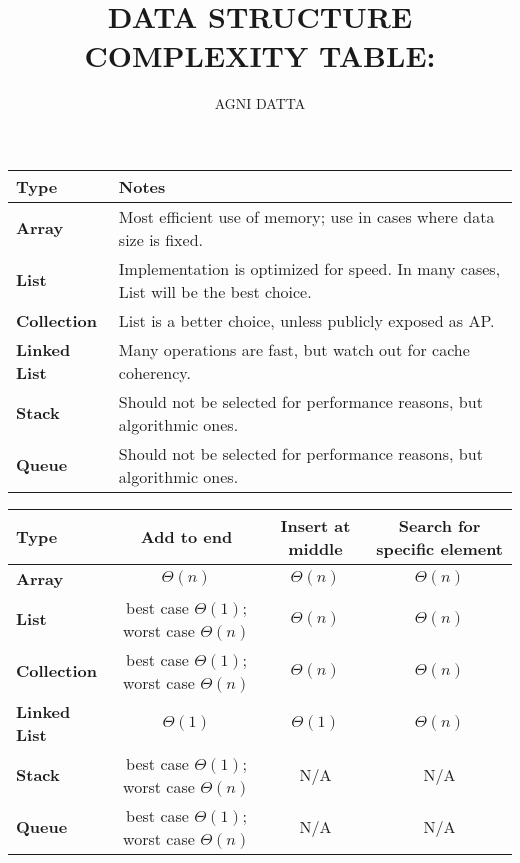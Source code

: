 \documentclass{article}
\providecommand{\tabularnewline}{\\}
\begin{document}
\title{\textbf{DATA STRUCTURE COMPLEXITY TABLE:}}
\author{AGNI DATTA}

\maketitle
\medskip{}

\begin{center}
{\small{}}%
\begin{tabular}{|l|l|}
\hline 
\textbf{\small{}Type} & \textbf{\small{}Notes}\tabularnewline
\hline 
\hline 
\textbf{\small{}Array} & {\small{}Most efficient use of memory; use in cases where data size
is fixed.}\tabularnewline
\hline 
\textbf{\small{}List} & {\small{}Implementation is optimized for speed. In many cases, List
will be the best choice.}\tabularnewline
\hline 
\textbf{\small{}Collection} & {\small{}List is a better choice, unless publicly exposed as AP.}\tabularnewline
\hline 
\textbf{\small{}Linked List} & {\small{}Many operations are fast, but watch out for cache coherency.}\tabularnewline
\hline 
\textbf{\small{}Stack} & {\small{}Should not be selected for performance reasons, but algorithmic
ones.}\tabularnewline
\hline 
\textbf{\small{}Queue} & {\small{}Should not be selected for performance reasons, but algorithmic
ones.}\tabularnewline
\hline 
\end{tabular}{\small\par}
\par\end{center}

\begin{center}
{\small{}\medskip{}
}{\small\par}
\par\end{center}

\begin{center}
{\small{}}%
\begin{tabular}{|l|c|c|c|}
\hline 
\textbf{\small{}Type} & \textbf{\small{}Add to end} & \textbf{\small{}Insert at middle} & \textbf{\small{}Search for specific element}\tabularnewline
\hline 
\hline 
\textbf{\small{}Array} & {\small{}$\Theta(n)$} & {\small{}$\Theta(n)$} & {\small{}$\Theta(n)$}\tabularnewline
\hline 
\textbf{\small{}List} & {\small{}best case $\Theta(1)$; worst case $\Theta(n)$} & {\small{}$\Theta(n)$} & {\small{}$\Theta(n)$}\tabularnewline
\hline 
\textbf{\small{}Collection} & {\small{}best case $\Theta(1)$; worst case $\Theta(n)$} & {\small{}$\Theta(n)$} & {\small{}$\Theta(n)$}\tabularnewline
\hline 
\textbf{\small{}Linked List} & {\small{}$\Theta(1)$} & {\small{}$\Theta(1)$} & {\small{}$\Theta(n)$}\tabularnewline
\hline 
\textbf{\small{}Stack} & {\small{}best case $\Theta(1)$; worst case $\Theta(n)$} & {\small{}N/A } & {\small{}N/A }\tabularnewline
\hline 
\textbf{\small{}Queue} & {\small{}best case $\Theta(1)$; worst case $\Theta(n)$} & {\small{}N/A } & {\small{}N/A }\tabularnewline
\hline 
\end{tabular}{\small\par}
\par\end{center}
\end{document}
